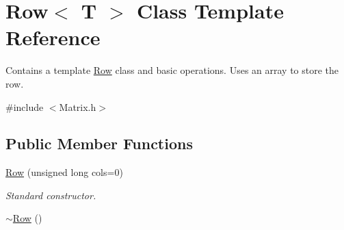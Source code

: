 \hypertarget{class_row}{}\section{Row$<$ T $>$ Class Template Reference}
\label{class_row}


Contains a template \hyperlink{class_row}{Row} class and basic operations. Uses an array to store the row.  




{\ttfamily \#include $<$Matrix.\+h$>$}

\subsection*{Public Member Functions}
\begin{DoxyCompactItemize}
\item 
\hyperlink{class_row_a32774cba0d7cdb6f0d7100c395ece9e5}{Row} (unsigned long cols=0)
\begin{DoxyCompactList}\small\item\em Standard constructor. \end{DoxyCompactList}\item 
\hyperlink{class_row_a8e888a33060156cd2e3757a95e9feee1}{$\sim$\+Row} ()\hypertarget{class_row_a8e888a33060156cd2e3757a95e9feee1}{}\label{class_row_a8e888a33060156cd2e3757a95e9feee1}


\end{DoxyCompactItemize}

